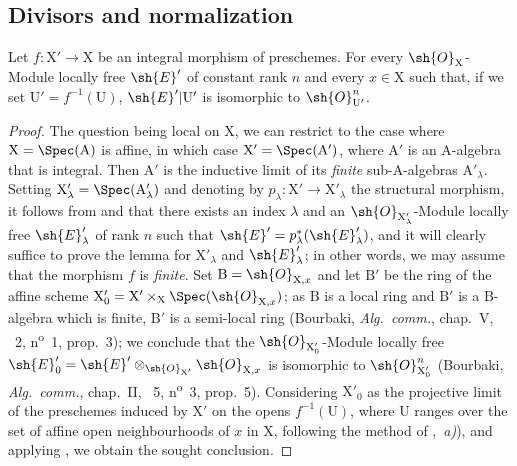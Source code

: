 \subsection{Divisors and normalization}
\label{subsection:IV.21.8}

\begin{lemma}[21.8.1]
\label{IV.21.8.1}
Let $f:\mathrm{X}'\to\mathrm{X}$ be an integral morphism of preschemes.
For every $\sh{O}_{\mathrm{X}}$-Module locally free $\sh{E}'$ of constant rank $n$ and every $x\in\mathrm{X}$ such that, if we set $\mathrm{U}'=f^{-1}(\mathrm{U})$, $\sh{E}'|\mathrm{U}'$ is isomorphic to $\sh{O}_{\mathrm{U}'}^n$.
\end{lemma}

\begin{proof}
The question being local on $\mathrm{X}$, we can restrict to the case where $\mathrm{X}=\Spec(\mathrm{A})$ is affine, in which case $\mathrm{X}'=\Spec(\mathrm{A}')$, where $\mathrm{A}'$ is an $\mathrm{A}$-algebra that is integral.
Then $\mathrm{A}'$ is the inductive limit of its \emph{finite} sub-$\mathrm{A}$-algebras $\mathrm{A}'_\lambda$.
Setting $\mathrm{X}'_\lambda=\Spec(\mathrm{A}'_\lambda)$ and denoting by $p_\lambda:\mathrm{X}'\to\mathrm{X}'_\lambda$ the structural morphism, it follows from  and  that there exists an index $\lambda$ and an $\sh{O}_{\mathrm{X}'_\lambda}$-Module locally free $\sh{E}'_\lambda$ of rank $n$ such that $\sh{E}'=p_\lambda^*(\sh{E}'_\lambda)$, and it will clearly suffice to prove the lemma for $\mathrm{X}'_\lambda$ and $\sh{E}'_\lambda$;
in other words, we may assume that the morphism $f$ is \emph{finite}.
Set $\mathrm{B}=\sh{O}_{\mathrm{X},x}$ and let $\mathrm{B}'$ be the ring of the affine scheme $\mathrm{X}'_0=\mathrm{X}'\times_\mathrm{X}\Spec(\sh{O}_{\mathrm{X},x})$;
as $\mathrm{B}$ is a local ring and $\mathrm{B}'$ is a $\mathrm{B}$-algebra which is finite, $\mathrm{B}'$ is a semi-local ring (Bourbaki, \emph{Alg.\ comm.}, chap.~V, \textsection~2, n\textsuperscript{o}~1, prop.~3);
we conclude that the $\sh{O}_{\mathrm{X}'_0}$-Module locally free $\sh{E}'_0=\sh{E}'\otimes_{\sh{O}_{\mathrm{X}'}}\sh{O}_{\mathrm{X},x}$ is isomorphic to $\sh{O}_{\mathrm{X}'_0}^n$ (Bourbaki, \emph{Alg.\ comm.}, chap.~II, \textsection~5, n\textsuperscript{o}~3, prop.~5).
Considering $\mathrm{X}'_0$ as the
projective limit of the preschemes induced by $\mathrm{X}'$ on the opens $f^{-1}(\mathrm{U})$, where $\mathrm{U}$ ranges over the set of affine open neighbourhoods of $x$ in $\mathrm{X}$, following the method of ,{}~\emph{a)}), and applying , we obtain the sought conclusion.
\end{proof}

